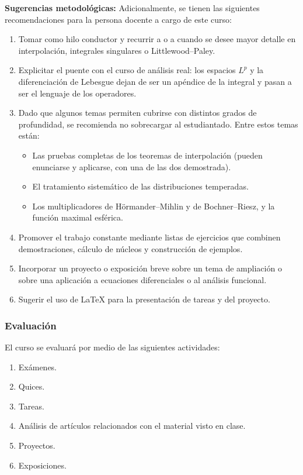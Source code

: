 \begin{refsection}
\textbf{Sugerencias metodológicas:} Adicionalmente, se tienen las siguientes recomendaciones para la persona docente a cargo de este curso:
\begin{enumerate}
    \item Tomar \cite{Duo01} como hilo conductor y recurrir a \cite{Gra14} o a \cite{SW71} cuando se desee mayor detalle en interpolación, integrales singulares o Littlewood--Paley.
    \item Explicitar el puente con el curso de análisis real: los espacios $L^p$ y la diferenciación de Lebesgue dejan de ser un apéndice de la integral y pasan a ser el lenguaje de los operadores.
    \item Dado que algunos temas permiten cubrirse con distintos grados de profundidad, se recomienda no sobrecargar al estudiantado. Entre estos temas están:
    \begin{itemize}
        \item Las pruebas completas de los teoremas de interpolación (pueden enunciarse y aplicarse, con una de las dos demostrada).
        \item El tratamiento sistemático de las distribuciones temperadas.
        \item Los multiplicadores de Hörmander--Mihlin y de Bochner--Riesz, y la función maximal esférica.
    \end{itemize}
    \item Promover el trabajo constante mediante listas de ejercicios que combinen demostraciones, cálculo de núcleos y construcción de ejemplos.
    \item Incorporar un proyecto o exposición breve sobre un tema de ampliación o sobre una aplicación a ecuaciones diferenciales o al análisis funcional.
    \item Sugerir el uso de \LaTeX{} para la presentación de tareas y del proyecto.
\end{enumerate}

\subsubsection*{Evaluación}

El curso se evaluará por medio de las siguientes actividades:

\begin{enumerate}
\item Exámenes.
\item Quices.
\item Tareas.
\item Análisis de artículos relacionados con el material visto en clase.
\item Proyectos.
\item Exposiciones.
\end{enumerate}

\nocite{Duo01}
\nocite{Fol99}
\nocite{Gra14}
\nocite{Gra14b}
\nocite{Kat04}
\nocite{Ste93}
\nocite{SS05}
\nocite{SW71}

\printcursosbibliography
\end{refsection}

